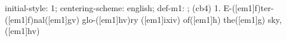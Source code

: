 initial-style: 1;
centering-scheme: english;
def-m1: \grealign;
(cb4) 1. E-([em1]f)ter-([em1]f)nal([em1]gv) glo-([em1]hv)ry ([em1]ixiv) of([em1]h) the([em1]g) sky,([em1]hv)